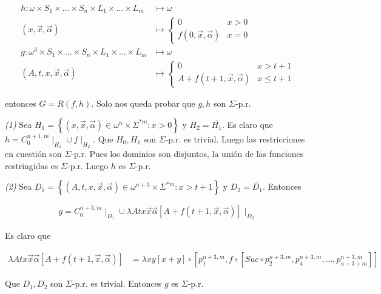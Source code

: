 \documentclass[a4paper, 12pt]{article}
\begin{document}
\begin{align*}
    h : \omega \times S_1 \times \ldots \times S_n \times L_1 \times  \ldots
    \times L_m &\mapsto \omega \\ (x, \vec{x}, \vec{\alpha}) &\mapsto  
    \begin{cases}
        0 & x > 0 \\ 
        f(0, \vec{x}, \vec{\alpha})  & x = 0
    \end{cases} \\
    g : \omega^3 \times S_1 \times  \ldots \times S_n \times L_1 \times \ldots
    \times L_m &\mapsto \omega \\ 
    (A, t, x, \vec{x}, \vec{\alpha}) &\mapsto \begin{cases}
        0 & x > t + 1 \\ 
        A + f(t + 1, \vec{x}, \vec{\alpha}) & x \leq t + 1
    \end{cases}
\end{align*}

entonces $G = R(f, h)$. Solo nos queda probar que $g, h$ son $\Sigma$-p.r. 

\textit{(1)} Sea $H_1 = \left\{ (x, \vec{x}, \vec{\alpha}) \in \omega^{n} \times
\Sigma^{*m} : x > 0 \right\} $ y $H_2 = \overline{H_1}$. Es claro que $h =
C_{0}^{n+1, m}\mid_{H_1} \cup f\mid_{H_2}$. Que $H_0, H_1$ son $\Sigma$-p.r. es
trivial. Luego las restricciones en cuestión son $\Sigma$-p.r. Pues los dominios
son disjuntos, la unión de las funciones restringidas es $\Sigma$-p.r. Luego $h$
es $\Sigma$-p.r. 

\textit{(2)} Sea $D_1 = \left\{ (A, t, x, \vec{x}, \vec{\alpha}) \in
\omega^{n+3} \times \Sigma^{*m}  : x > t + 1 \right\} $ y $D_2 =
\overline{D_1}$. Entonces 

\begin{align*}
    g = C_0^{n+3, m} \mid_{D_1} \cup \lambda Atx\vec{x}\vec{\alpha} \left[ A +
    f(t+1, \vec{x}, \vec{\alpha})  \right] \mid_{D_2}
\end{align*}

Es claro que 

\begin{align*}
    \lambda A t x \vec{x}\vec{\alpha} \left[ A + f(t+1, \vec{x}, \vec{\alpha})
    \right] &= \lambda xy \left[ x + y  \right] \circ \left[ p_1^{n+3, m},  f
    \circ \left[ Suc \circ p_2^{n+3, m}, p_4^{n+3, m}, \ldots, p_{n+3+m}^{n+3, m} \right]  \right] 
\end{align*}

Que $D_1, D_2$ son $\Sigma$-p.r. es trivial. Entonces $g$ es $\Sigma$-p.r. 
\end{document}
